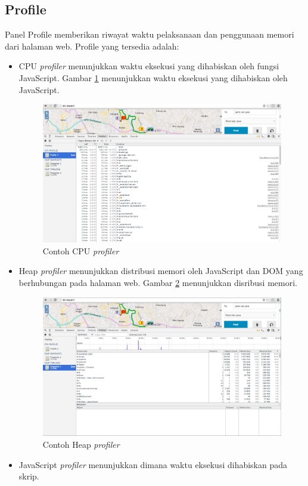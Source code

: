 \subsection{Profile}
Panel Profile memberikan riwayat waktu pelaksanaan dan penggunaan memori dari halaman web. Profile yang tersedia adalah:
\begin{itemize}
	\item CPU \textit{profiler} menunjukkan waktu eksekusi yang dihabiskan oleh fungsi JavaScript. Gambar \ref{fig:2_devtools_profile_cpu} menunjukkan waktu eksekusi yang dihabiskan oleh JavaScript.
			\begin{figure}[H]
				\centering
				\includegraphics[scale=0.3]{Gambar/devtools-profile-cpu}
				\caption{Contoh CPU \textit{profiler}} 
				\label{fig:2_devtools_profile_cpu}
			\end{figure}
	\item Heap \textit{profiler} menunjukkan distribusi memori oleh JavaScript dan DOM yang berhubungan pada halaman web. Gambar \ref{fig:2_devtools_profile_heap} menunjukkan disribusi memori. 
			\begin{figure}[H]
				\centering
				\includegraphics[scale=0.3]{Gambar/devtools-profile-heap}
				\caption{Contoh Heap \textit{profiler}} 
				\label{fig:2_devtools_profile_heap}
			\end{figure}
	\item JavaScript \textit{profiler} menunjukkan dimana waktu eksekusi dihabiskan pada skrip.
\end{itemize}


